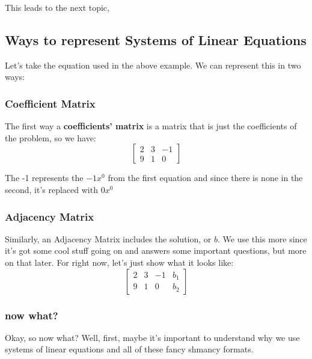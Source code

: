 This leads to the next topic,
\subsection{Ways to represent Systems of Linear Equations}
Let's take the equation used in the above example. We can represent this in two ways:

\subsubsection{Coefficient Matrix}
The first way a \textbf{coefficients' matrix} is a matrix that is just the coefficients
of the problem, so we have:
\begin{equation}
    \begin{bmatrix}
        2 & 3 & -1 \\
        9 & 1 & 0
    \end{bmatrix}
\end{equation}

The -1 represents the \(-1x^0\) from the first equation and since there is none
in the second, it's replaced with \(0 x^0\)

\subsubsection{Adjacency Matrix}
Similarly, an Adjacency Matrix includes the solution, or \(b\). We use this more since
it's got some cool stuff going on and answers some important questions, but more on that
later. For right now, let's just show what it looks like:
\begin{equation}
    \begin{bmatrix}
        2 & 3 & -1 & b_1 \\
        9 & 1 & 0 & b_2
    \end{bmatrix}
\end{equation}


\subsubsection{now what?}

Okay, so now what? Well, first, maybe it's important to understand why we use
systems of linear equations and all of these fancy shmancy formats.

